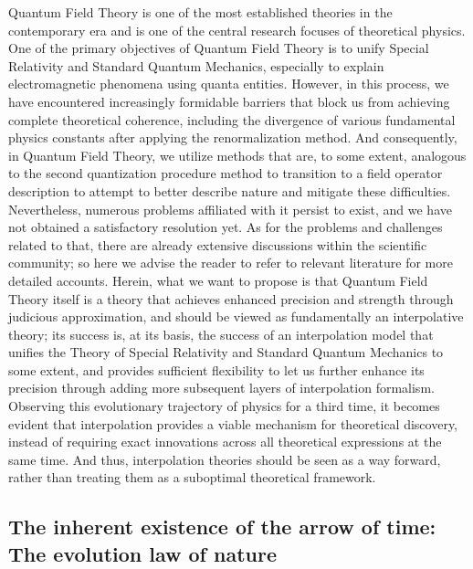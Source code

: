 \documentclass{article}
\begin{document}
Quantum Field Theory is one of the most established theories in the contemporary era and is one of the central research focuses of theoretical physics. One of the primary objectives of Quantum Field Theory is to unify Special Relativity and Standard Quantum Mechanics, especially to explain electromagnetic phenomena using quanta entities. \cite{BerestetskiiLifshitzV4_2015} However, in this process, we have encountered increasingly formidable barriers that block us from achieving complete theoretical coherence, including the divergence of various fundamental physics constants after applying the renormalization method. \cite{Faizal2025} And consequently, in Quantum Field Theory, we utilize methods that are, to some extent, analogous to the second quantization procedure method to transition to a field operator description to attempt to better describe nature and mitigate these difficulties. \cite{BerestetskiiLifshitzV4_2015} Nevertheless, numerous problems affiliated with it persist to exist, and we have not obtained a satisfactory resolution yet. As for the problems and challenges related to that, there are already extensive discussions within the scientific community; so here we advise the reader to refer to relevant literature for more detailed accounts. \cite{Zampeli2025} Herein, what we want to propose is that Quantum Field Theory itself is a theory that achieves enhanced precision and strength through judicious approximation, and should be viewed as fundamentally an interpolative theory; its success is, at its basis, the success of an interpolation model that unifies the Theory of Special Relativity and Standard Quantum Mechanics to some extent, and provides sufficient flexibility to let us further enhance its precision through adding more subsequent layers of interpolation formalism. \cite{Covoni2025} Observing this evolutionary trajectory of physics for a third time, it becomes evident that interpolation provides a viable mechanism for theoretical discovery, \cite{Wilson1974} instead of requiring exact innovations across all theoretical expressions at the same time. And thus, interpolation theories should be seen as a way forward, rather than treating them as a suboptimal theoretical framework. \cite{Weinberg2014a}

\subsection{The inherent existence of the arrow of time: The evolution law of nature}
\end{document}
